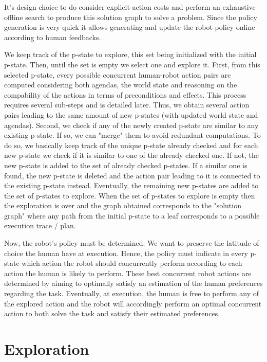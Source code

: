 It's design choice to do consider explicit action costs and perform an exhaustive offline search to produce this solution graph to solve a problem. Since the policy generation is very quick it allows generating and update the robot policy online according to human feedbacks. 

We keep track of the p-state to explore, this set being initialized with the initial p-state. Then, until the set is empty we select one and explore it.
First, from this selected p-state, every possible concurrent human-robot action pairs are computed considering both agendas, the world state and reasoning on the compability of the actions in terms of preconditions and effects. This process requires several sub-steps and is detailed later. Thus, we obtain several action pairs leading to the same amount of new p-states (with updated world state and agendas).
Second, we check if any of the newly created p-state are similar to any existing p-state. If so, we can "merge" them to avoid redundant computations. To do so, we basically keep track of the unique p-state already checked and for each new p-state we check if it is similar to one of the already checked one. 
If not, the new p-state is added to the set of already checked p-states. 
If a similar one is found, the new p-state is deleted and the action pair leading to it is connected to the existing p-state instead.
Eventually, the remaining new p-states are added to the set of p-states to explore. 
When the set of p-states to explore is empty then the exploration is over and the graph obtained corresponds to the "solution graph" where any path from the initial p-state to a leaf corresponds to a possible execution trace / plan.

Now, the robot's policy must be determined. We want to preserve the latitude of choice the human have at execution. Hence, the policy must indicate in every p-state which action the robot should concurrently perform according to each action the human is likely to perform. These best concurrent robot actions are determined by aiming to optimally satisfy an estimation of the human preferences regarding the task. Eventually, at execution, the human is free to perform any of the explored action and the robot will accordingly perform an optimal concurrent action to both solve the task and satisfy their estimated preferences.  

\section{Exploration}

